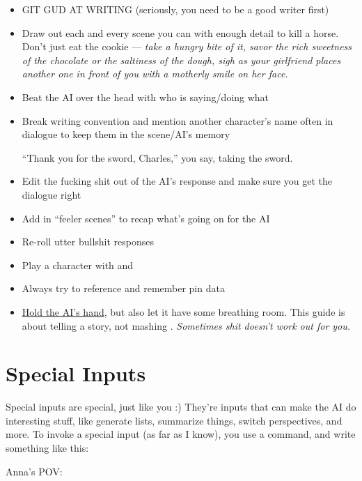 \documentclass[Avsfag-main.tex]{subfiles}
\begin{document}
\begin{itemize}
\item
  GIT GUD AT WRITING (seriously, you need to be a good writer first)
\item
  Draw out each and every scene you can with enough detail to kill a
  horse. Don't just eat the cookie --- \emph{take a hungry bite of it,
  savor the rich sweetness of the chocolate or the saltiness of the
  dough, sigh as your girlfriend places another one in front of you with
  a motherly smile on her face.}
\item
  Beat the AI over the head with who is saying/doing what
\item
  Break writing convention and mention another character's name often in
  dialogue to keep them in the scene/AI's memory

  \begin{storyb}
    \story ``Thank you for the sword, Charles,'' you say, taking the
    sword.
  \end{storyb}
\item
  Edit the fucking shit out of the AI's response and make sure you get
  the dialogue right
\item
  Add in ``feeler scenes'' to recap what's going on for the AI
\item
  Re-roll utter bullshit responses
\item
  Play a character with \say and \Do
\item
  Always try to reference \wi and remember pin data
\item
  \href{https://i.redd.it/wtoc2fwzb0v11.jpg}{Hold the AI's hand},
  but also let it have some breathing room. This guide is about telling
  a story, not mashing \keys{\return}. \emph{Sometimes shit doesn't work out for
  you.}
\end{itemize}


\chapter{Special Inputs}
\label{ch:specialinputs}

Special inputs are special, just like you :) They're inputs that can make the AI do interesting stuff, like generate lists, summarize things, switch perspectives, and more.
To invoke a special input (as far as I know), you use a \story command, and write something like this:

\begin{storyb}
	\story Anna's POV:
\end{storyb}
\end{document}
